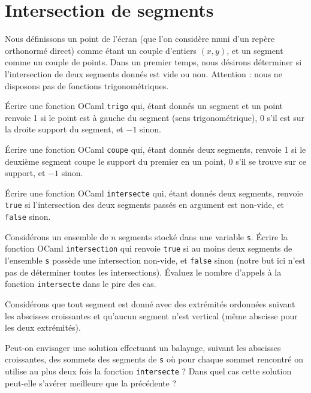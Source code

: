 \renewcommand{\SourceFile}{6-geometrie-et-images/src/6-6.ml}

\section{Intersection de segments}

Nous définissons un point de l'écran (que l'on considère muni d'un repère orthonormé direct) comme étant un couple d'entiers $(x,y)$, et un segment comme un couple de points. Dans un premier temps, nous désirons déterminer si l'intersection de deux segments donnés est vide ou non. Attention : nous ne disposons pas de fonctions trigonométriques.
\medskip

\Q
Écrire une fonction OCaml \texttt{trigo} qui, étant donnés un segment et un point renvoie 1 si le point est à gauche du segment (sens trigonométrique), 0 s'il est sur la droite support du segment, et $-1$ sinon.

\Q
Écrire une fonction OCaml \texttt{coupe} qui, étant donnés deux segments, renvoie 1 si le deuxième segment coupe le support du premier en un point, 0 s'il se trouve sur ce support, et $-1$ sinon.

\Q
Écrire une fonction OCaml \texttt{intersecte} qui, étant donnés deux segments, renvoie \texttt{true} si l'intersection des deux segments passés en argument est non-vide, et \texttt{false} sinon.

\Q
Considérons un ensemble de $n$ segments stocké dans une variable \texttt{s}. Écrire la fonction OCaml \texttt{intersection} qui renvoie \texttt{true} si au moins deux segments de l'ensemble \texttt{s} possède une intersection non-vide, et \texttt{false} sinon (notre but ici n'est pas de déterminer toutes les intersections). Évaluez le nombre d'appels à la fonction \texttt{intersecte} dans le pire des cas.

\Q
Considérons que tout segment est donné avec des extrémités ordonnées suivant les abscisses croissantes et qu'aucun segment n'est vertical (même abscisse pour les deux extrémités).
\medskip

Peut-on envisager une solution effectuant un balayage, suivant les abscisses croissantes, des sommets des segments de \texttt{s} où pour chaque sommet rencontré on utilise au plus deux fois la fonction \texttt{intersecte} ? Dans quel cas cette solution peut-elle s'avérer meilleure que la précédente ?

\Corrige
\vspace{.6cm}

